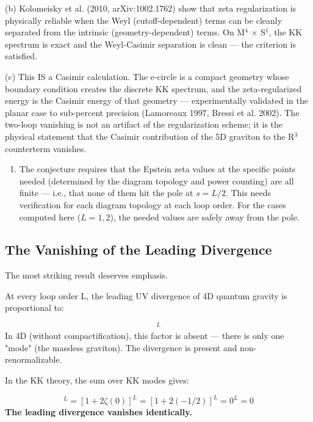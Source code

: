 \documentclass[aps,prd,preprint,superscriptaddress,longbibliography,floatfix]{revtex4-2}
\theoremstyle{remark}
\begin{document}
(b) Kolomeisky et al. (2010, arXiv:1002.1762) show that zeta regularization is physically reliable when the Weyl (cutoff-dependent) terms can be cleanly separated from the intrinsic (geometry-dependent) terms. On M$^{4}$ $\times$ S$^{1}$, the KK spectrum is exact and the Weyl-Casimir separation is clean --- the criterion is satisfied.

(c) This IS a Casimir calculation. The e-circle is a compact geometry whose boundary condition creates the discrete KK spectrum, and the zeta-regularized energy is the Casimir energy of that geometry --- experimentally validated in the planar case to sub-percent precision (Lamoreaux 1997, Bressi et al. 2002). The two-loop vanishing is not an artifact of the regularization scheme; it is the physical statement that the Casimir contribution of the 5D graviton to the R$^{3}$ counterterm vanishes.


\begin{enumerate}
  \item The conjecture requires that the Epstein zeta values at the specific points needed (determined by the diagram topology and power counting) are all finite --- i.e., that none of them hit the pole at $s = L/2$. This needs verification for each diagram topology at each loop order. For the cases computed here ($L = 1, 2$), the needed values are safely away from the pole.
\end{enumerate}



\subsection{The Vanishing of the Leading Divergence}

The most striking result deserves emphasis.

At every loop order L, the leading UV divergence of 4D quantum gravity is proportional to:


\begin{equation}
    [\sum_{n \in Z} 1]^L
\end{equation}
In 4D (without compactification), this factor is absent --- there is only one "mode" (the massless graviton). The divergence is present and non-renormalizable.

In the KK theory, the sum over KK modes gives:


\begin{equation}
    [\sum_{n \in Z} 1]^L = [1 + 2\zeta(0)]^L = [1 + 2(-1/2)]^L = 0^L = 0
\end{equation}
\textbf{The leading divergence vanishes identically.}
\end{document}
